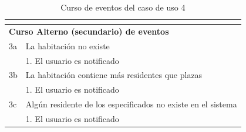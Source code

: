 \begin{table}[hp!]
{\begin{tabular}{|l|l|l|l|}
        \hline
        \multicolumn{4}{l}{}                                                                                                                                                                                                                                                                                                  \\ 
        \hline
        \multicolumn{4}{|l|}{{\cellcolor[rgb]{0.886,0.886,0.886}}\textbf{Curso Alterno (secundario) de eventos}}                                                                                                                                                                                                              \\ 
        \hline
        3a & \multicolumn{3}{l|}{La habitación no existe}                                                                                                                                                                                                                                                                     \\ 
        \hline
        & \multicolumn{3}{l|}{1. El usuario es notificado}                                                                                                                                                                                                                                                                 \\ 
        \hline
        3b & \multicolumn{3}{l|}{La habitación contiene más residentes que plazas}                                                                                                                                                                                                                                            \\ 
        \hline
        & \multicolumn{3}{l|}{1. El usuario es notificado}                                                                                                                                                                                                                                                                 \\ 
        \hline
        3c & \multicolumn{3}{l|}{Algún residente de los especificados no existe en el sistema}                                                                                                                                                                                                                                \\ 
        \hline
        & \multicolumn{3}{l|}{1. El usuario es notificado}                                                                                                                                                                                                                                                                 \\ 
        \hline
        \end{tabular}
    }
    \caption{Curso de eventos del caso de uso 4}
\end{table}

